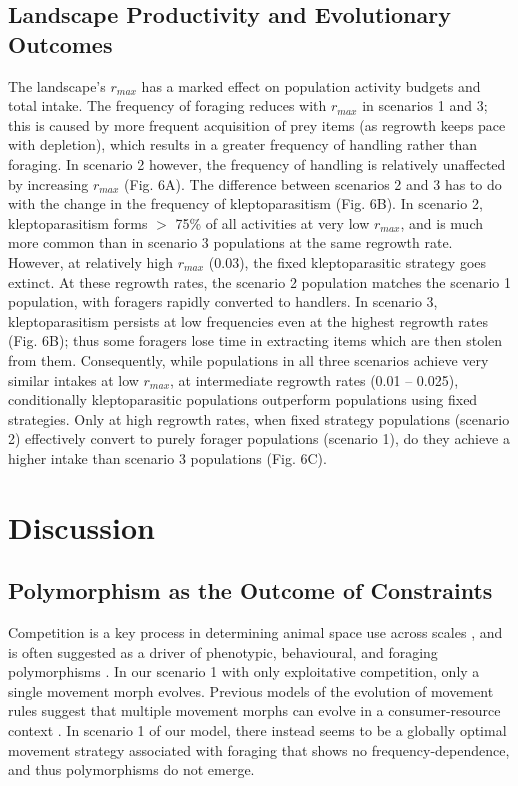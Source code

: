 \documentclass[11pt]{article}
\begin{document}
\subsection{Landscape Productivity and Evolutionary Outcomes}

The landscape's $r_{max}$ has a marked effect on population activity budgets and total intake.
The frequency of foraging reduces with $r_{max}$ in scenarios 1 and 3; this is caused by more frequent acquisition of prey items (as regrowth keeps pace with depletion), which results in a greater frequency of handling rather than foraging.
In scenario 2 however, the frequency of handling is relatively unaffected by increasing $r_{max}$ (Fig. 6A).
The difference between scenarios 2 and 3 has to do with the change in the frequency of kleptoparasitism (Fig. 6B).
In scenario 2, kleptoparasitism forms $>$ 75\% of all activities at very low $r_{max}$, and is much more common than in scenario 3 populations at the same regrowth rate.
However, at relatively high $r_{max}$ (0.03), the fixed kleptoparasitic strategy goes extinct.
At these regrowth rates, the scenario 2 population matches the scenario 1 population, with foragers rapidly converted to handlers.
In scenario 3, kleptoparasitism persists at low frequencies even at the highest regrowth rates (Fig. 6B); thus some foragers lose time in extracting items which are then stolen from them.
Consequently, while populations in all three scenarios achieve very similar intakes at low $r_{max}$, at intermediate regrowth rates (0.01 -- 0.025), conditionally kleptoparasitic populations outperform populations using fixed strategies.
Only at high regrowth rates, when fixed strategy populations (scenario 2) effectively convert to purely forager populations (scenario 1), do they achieve a higher intake than scenario 3 populations (Fig. 6C).

\section{Discussion}

\subsection{Polymorphism as the Outcome of Constraints}

Competition is a key process in determining animal space use across scales \citep{fretwell1970, vandermeer1997}, and is often suggested as a driver of phenotypic, behavioural, and foraging polymorphisms \citep{Pfennig2012, Baldauf2014}.
In our scenario 1 with only exploitative competition, only a single movement morph evolves.
Previous models of the evolution of movement rules suggest that multiple movement morphs can evolve in a consumer-resource context \citep[][Netz et al. in prep.]{getz2015}.
In scenario 1 of our model, there instead seems to be a globally optimal movement strategy associated with foraging that shows no frequency-dependence, and thus polymorphisms do not emerge.
\end{document}
